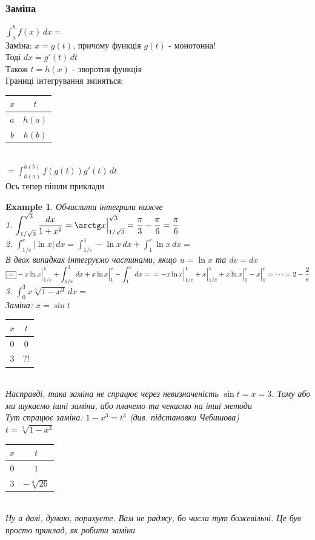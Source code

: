 \documentclass[a4paper, 14pt]{extarticle}
\def\huge{\displaystyle}
\def\bigline{\vspace{5mm}\\}
\theoremstyle{theoremdd}
\theoremstyle{theoremdd}
\theoremstyle{theoremdd}
\theoremstyle{theoremdd}
\newtheorem{example}[theorem]{Example}
\theoremstyle{theoremdd}
\theoremstyle{theoremdd}
\theoremstyle{theoremdd}
\theoremstyle{theoremdd}
\begin{document}
\subsubsection{Заміна}
$\huge\int_a^b f(x)\,dx \boxed{=} $\\
Заміна: $x = g(t)$, причому функція $g(t)$ - монотонна!\\
Тоді $dx = g'(t)\,dt$\\
Також $t = h(x)$ - зворотня функція\\
Границі інтегрування зміняться:\\
\begin{tabular}{c|c}
$x$ & $t$ \\
\hline
$a$ & $h(a)$ \\
$b$ & $h(b)$ \\
\end{tabular} \\
$\boxed{=} \huge\int_{h(a)}^{h(b)} f(g(t))g'(t)\,dt$
\bigline
Ось тепер пішли приклади
\begin{example} 
Обчислити інтеграли нижче\\
1. $\huge\int_{1/ \sqrt{3}}^{\sqrt{3}} \dfrac{dx}{1+x^2} = \arctg x \Big|_{1/ \sqrt{3}}^{\sqrt{3}} = \dfrac{\pi}{3} - \dfrac{\pi}{6} = \dfrac{\pi}{6}$
\bigline
2. $\huge\int_{1/e}^e |\ln x|\,dx = \huge\int_{1/e}^1 -\ln x \,dx + \int_1^e \ln x\,dx \boxed{=} $\\
В двох випадках інтегруємо частинами, якщо $u = \ln x$ та $dv = dx$\\
$\boxed{=} -x \ln x \Big|_{1/e}^1 + \huge\int_{1/e}^1\,dx + x \ln x \Big|_{1}^e - \huge\int_{1}^e\,dx = \\ = -x \ln x \Big|_{1/e}^1 + x\Big|_{1/e}^1 + x \ln x \Big|_{1}^e - x\Big|_1^e = \dots = 2 - \dfrac{2}{e}$
\bigline
3. $\huge\int_0^3 x \sqrt[3]{1-x^3}\,dx = $\\
Заміна: $x = \sin t$\\
\begin{tabular}{c|c}
$x$ & $t$ \\
\hline
$0$ & $0$ \\
$3$ & $?!$ \\
\end{tabular} \\
Насправді, така заміна не спрацює через невизначеність $\sin t = x = 3$. Тому або ми шукаємо ішні заміни, або плачемо та чекаємо на інші методи\\
Тут спрацює заміна: $1-x^3=t^3$ (див. підстановки Чебишова)\\
$t = \sqrt[3]{1-x^3}$\\
\begin{tabular}{c|c}
$x$ & $t$ \\
\hline
$0$ & $1$ \\
$3$ & $-\sqrt[3]{26}$ \\
\end{tabular} \\
Ну а далі, думаю, порахуєте. Вам не раджу, бо числа тут божевільні. Це був просто приклад, як робити заміни
\end{example}
\end{document}
